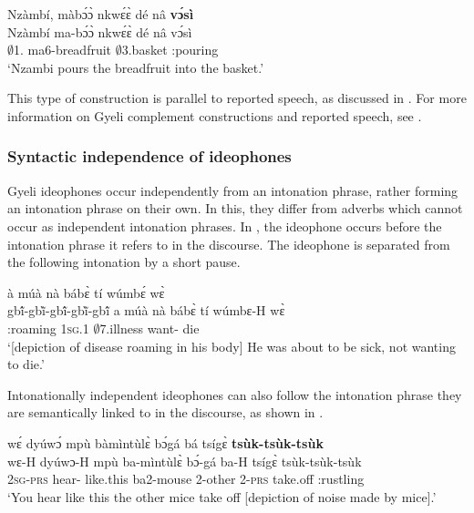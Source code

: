 

\ea \label{IDEOna}
  \glll Nzàmbí, màbɔ́ɔ̀ nkwɛ́ɛ̀ dé nâ {\bfseries vɔ́sì} \\
    Nzàmbí ma-bɔ́ɔ̀ nkwɛ́ɛ̀ dé nâ vɔ́sì \\
          $\emptyset$1.{\PN} ma6-breadfruit $\emptyset$3.basket {\LOC} {\COMP} {\IDEO}:pouring \\
    \trans `Nzambi pours the breadfruit into the basket.'
\z

\noindent This type of construction is parallel to reported speech, as discussed in \citet{guldemann2008}. For more information on Gyeli complement constructions and reported speech, see .

\subsubsection*{Syntactic independence of ideophones}
Gyeli ideophones occur independently from an intonation phrase, rather forming an intonation phrase on their own. In this, they differ from adverbs which cannot occur as independent intonation phrases. In , the ideophone occurs before the intonation phrase it refers to in the discourse. The ideophone is separated from the following intonation by a short pause.


\ea \label{IDEOfree1}
     à múà nà bábɛ̀ tí wúmbɛ́ wɛ̀ \\
            gbĩ́-gbĩ̀-gbĩ́-gbĩ̀-gbĩ́  a múà nà bábɛ̀ tí wúmbɛ-H wɛ̀ \\
         {\IDEO}:roaming 1\textsc{sg}.{\PST}1 {\PROSP} {\COM} $\emptyset$7.illness {\NEG} want-{\R} die\\
    \trans `[depiction of disease roaming in his body] He was about to be sick, not wanting to die.'
\z

\noindent Intonationally independent ideophones can also follow the intonation phrase they are semantically linked to in the discourse, as shown in .

\ea \label{IDEOfree2}
  \glll wɛ́ dyúwɔ́ mpù bàmìntùlɛ̀ bɔ́gá bá tsígɛ̀ {\bfseries tsùk-tsùk-tsùk}\\
        wɛ-H dyúwɔ-H mpù ba-mìntùlɛ̀ bɔ́-gá ba-H tsígɛ̀ tsùk-tsùk-tsùk\\
        2\textsc{sg}-\textsc{prs} hear-{\R} like.this ba2-mouse 2-other 2-\textsc{prs} take.off {\IDEO}:rustling\\
    \trans `You hear like this the other mice take off [depiction of noise made by mice].'
\z

